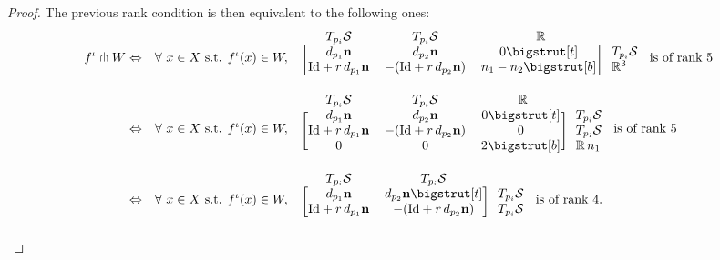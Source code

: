 \documentclass[11pt]{article}
\newcommand{\R}{\mathbb{R}}
\newcommand{\io}{\iota}
\newcommand{\nbf}{\mathbf{n}}
\newcommand{\Surf}{\mathcal{S}}
\newcommand{\Id}{\mathrm{Id}}
\newcommand\topstrut[1][1.2ex]{\setlength\bigstrutjot{#1}{\bigstrut[t]}}
\newcommand\botstrut[1][1.2ex]{\setlength\bigstrutjot{#1}{\bigstrut[b]}}
\theoremstyle{plain}
\theoremstyle{definition}
\theoremstyle{remark}
\begin{document}
\begin{proof}
The previous rank condition is then equivalent to the following ones: 
\begin{align*}
f^\io \pitchfork W & \Leftrightarrow &\forall\ x \in X \text{ s.t. } f^\io(x) \in W, \quad & \begin{blockarray}{*{3}{c} l}
		\begin{block}{cccl}
			T_{p_i} \Surf & T_{p_i} \Surf & ~~\R~~ & \\
		\end{block}
		\begin{block}{[ccc] l}
			d_{p_1} \nbf & d_{p_2} \nbf & 0 \topstrut  & T_{p_i} \Surf \\
			\Id + r \, d_{p_1} \nbf & - (\Id + r \, d_{p_2} \nbf) & n_1 - n_2 \botstrut & \R^3 \\
		\end{block}
	\end{blockarray}
\text{ is of rank } 5 \\
& \Leftrightarrow & \forall\ x \in X \text{ s.t. } f^\io(x) \in W, \quad & \begin{blockarray}{*{3}{c} l}
		\begin{block}{cccl}
			T_{p_i} \Surf & T_{p_i} \Surf & ~~\R~~ & \\
		\end{block}
		\begin{block}{[ccc] l}
			d_{p_1} \nbf & d_{p_2} \nbf & 0 \topstrut  & T_{p_i} \Surf \\
			\Id + r \, d_{p_1} \nbf & - (\Id + r \, d_{p_2} \nbf) & 0 & T_{p_i} \Surf  \\
			0 & 0 & 2 \botstrut & \R \, n_1 \\
		\end{block}
	\end{blockarray}
\text{ is of rank } 5 \\
& \Leftrightarrow & \forall\ x \in X \text{ s.t. } f^\io(x) \in W, \quad & \begin{blockarray}{cc l}
		\begin{block}{ccl}
			T_{p_i} \Surf & T_{p_i} \Surf & \\
		\end{block}
		\begin{block}{[cc] l}
			d_{p_1} \nbf & d_{p_2} \nbf \topstrut  & T_{p_i} \Surf \\
			\Id + r \, d_{p_1} \nbf & - (\Id + r \, d_{p_2} \nbf) & T_{p_i} \Surf \\
		\end{block}
	\end{blockarray}
	\text{ is of rank } 4.
\end{align*}


\end{proof}
\end{document}

